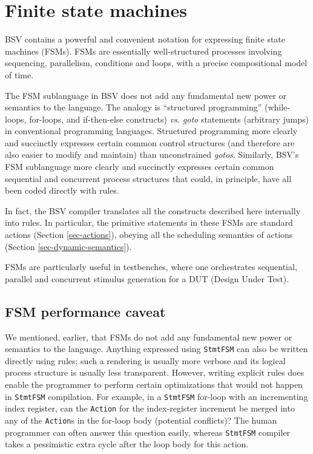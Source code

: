 \documentclass[twoside,letterpaper]{article}
\newcommand{\BSV}{BSV}
\newcommand{\te}[1]{\texttt{#1}}
\begin{document}
\section{Finite state machines}

\label{sec-fsms}


{\BSV} contains a powerful and convenient notation for expressing
finite state machines (FSMs).  FSMs are essentially well-structured
processes involving sequencing, parallelism, conditions and loops,
with a precise compositional model of time.

The FSM sublanguage in BSV does not add any fundamental new power or
semantics to the language.  The analogy is ``structured programming''
(while-loops, for-loops, and if-then-else constructs) \emph{vs.}
\emph{goto} statements (arbitrary jumps) in conventional programming
languages.  Structured programming more clearly and succinctly
expresses certain common control structures (and therefore are also
easier to modify and maintain) than unconstrained \emph{gotos}.
Similarly, BSV's FSM sublanguage more clearly and succinctly expresses
certain common sequential and concurrent process structures that
could, in principle, have all been coded directly with rules.

In fact, the {\BSV} compiler translates all the constructs described
here internally into rules.  In particular, the primitive statements
in these FSMs are standard actions (Section \ref{sec-actions}),
obeying all the scheduling semantics of actions (Section
\ref{sec-dynamic-semantics}).

FSMs are particularly useful in testbenches, where one orchestrates
sequential, parallel and concurrent stimulus generation for a DUT
(Design Under Test).




\subsection{FSM performance caveat}

We mentioned, earlier, that FSMs do not add any fundamental new power
or semantics to the language.  Anything expressed using \te{StmtFSM}
can also be written directly using rules; such a rendering is usually
more verbose and its logical process structure is usually less
transparent.  However, writing explicit rules does enable the
programmer to perform certain optimizations that would not happen in
\te{StmtFSM} compilation.  For example, in a \te{StmtFSM} for-loop
with an incrementing index register, can the \te{Action} for the
index-register increment be merged into any of the \te{Action}s in the
for-loop body (potential conflicts)?  The human programmer can often
answer this question easily, whereas \te{StmtFSM} compiler takes a
pessimistic extra cycle after the loop body for this action.
\end{document}
